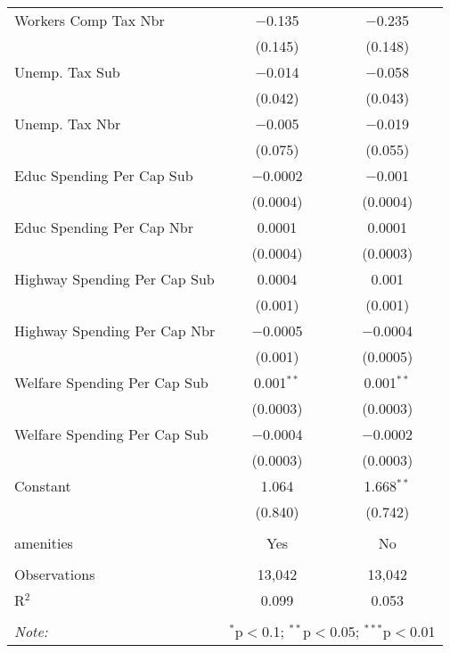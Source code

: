 \begin{table}[!htbp]
\begin{tabular}{@{\extracolsep{5pt}}lcc}
  Workers Comp Tax Nbr & $-$0.135 & $-$0.235 \\ 
  & (0.145) & (0.148) \\ 
  Unemp. Tax Sub & $-$0.014 & $-$0.058 \\ 
  & (0.042) & (0.043) \\ 
  Unemp. Tax Nbr & $-$0.005 & $-$0.019 \\ 
  & (0.075) & (0.055) \\ 
  Educ Spending Per Cap Sub & $-$0.0002 & $-$0.001 \\ 
  & (0.0004) & (0.0004) \\ 
  Educ Spending Per Cap Nbr & 0.0001 & 0.0001 \\ 
  & (0.0004) & (0.0003) \\ 
  Highway Spending Per Cap Sub & 0.0004 & 0.001 \\ 
  & (0.001) & (0.001) \\ 
  Highway Spending Per Cap Nbr & $-$0.0005 & $-$0.0004 \\ 
  & (0.001) & (0.0005) \\ 
  Welfare Spending Per Cap Sub & 0.001$^{**}$ & 0.001$^{**}$ \\ 
  & (0.0003) & (0.0003) \\ 
  Welfare Spending Per Cap Sub & $-$0.0004 & $-$0.0002 \\ 
  & (0.0003) & (0.0003) \\ 
  Constant & 1.064 & 1.668$^{**}$ \\ 
  & (0.840) & (0.742) \\ 
 \hline \\[-1.8ex] 
amenities & Yes & No \\ 
\hline \\[-1.8ex] 
Observations & 13,042 & 13,042 \\ 
R$^{2}$ & 0.099 & 0.053 \\ 
\hline 
\hline \\[-1.8ex] 
\textit{Note:}  & \multicolumn{2}{r}{$^{*}$p$<$0.1; $^{**}$p$<$0.05; $^{***}$p$<$0.01} \\ 
\end{tabular} 
\end{table} 
